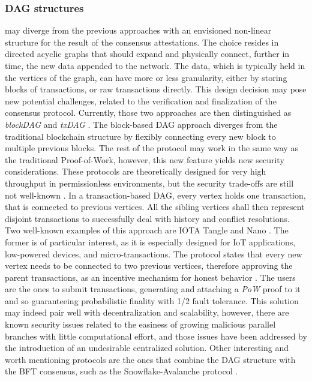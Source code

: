 \documentclass[journal]{IEEEtran}
\begin{document}
\subsubsection{DAG structures} may diverge from the previous approaches with an envisioned 
non-linear structure for the result of the consensus attestations. The choice resides in 
directed acyclic graphs that should expand and physically connect, further in time, the new
data appended to the network. The data, which is typically held in the vertices of the graph, 
can have more or less granularity, either by storing blocks of transactions, or raw transactions directly.
This design decision may pose new potential challenges, related to the verification and finalization of
the consensus protocol. Currently, those two approaches are then distinguished as \emph{blockDAG} and 
\emph{txDAG} \cite{survey-dist-consensus}. 
The block-based DAG approach diverges from the traditional blockchain structure by flexibly 
connecting every new block to multiple previous blocks. The rest of the protocol may work in the same way 
as the traditional Proof-of-Work, however, this new feature yields new security considerations. These protocols
are theoretically designed for very high throughput in permissionless environments, but the security trade-offs
are still not well-known \cite{sompolinsky2018phantom}.
In a transaction-based DAG, every vertex holds one transaction, that is connected to previous vertices. 
All the sibling vertices shall then represent disjoint transactions to successfully deal with history and conflict
resolutions. Two well-known examples of this approach are IOTA Tangle \cite{popov2018tangle} 
and Nano \cite{lemahieu2018nano}.
The former is of particular interest, as it is especially designed for IoT applications, low-powered devices, and
micro-transactions. The protocol states that every new vertex needs to be connected to two previous vertices, 
therefore approving the parent transactions, as an incentive mechanism for honest behavior \cite{survey-dist-consensus}. 
The users are the ones to submit transactions, generating and attaching a \emph{PoW} proof to it and 
so guaranteeing probabilistic finality with 1/2 fault tolerance. This solution may indeed pair well with 
decentralization and scalability, however, there are known security issues related to the
easiness of growing malicious parallel branches with little computational effort, and those issues have been 
addressed by the introduction of an undesirable centralized solution. 
Other interesting and worth mentioning protocols are the ones that combine the DAG structure with the BFT consensus, 
such as the Snowflake-Avalanche protocol \cite{rocket2018snowflake}.
\end{document}
